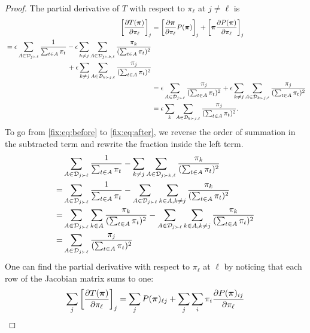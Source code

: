 \begin{proof}
The partial derivative of $T$ with respect to $\pi_\ell$ at $j \ne \ell$ is
\begin{align}
\left[ \frac{\partial T(\bm{\pi})}{\partial \pi_\ell} \right]_j
&= \left[ \frac{\partial \bm{\pi}}{\partial \pi_\ell} P(\bm{\pi}) \right]_j + \left[ \bm{\pi} \frac{\partial P(\bm{\pi})}{\partial \pi_\ell} \right]_j \\
\begin{split}
&= \epsilon \sum_{A \in \mathcal{D}_{j \succ \ell}} \frac{1}{\sum_{t \in A} \pi_t}
    - \epsilon \sum_{k \ne j} \sum_{A \in \mathcal{D}_{j \succ k,\ell}} \frac{\pi_k}{(\sum_{t \in A} \pi_t)^2} \\
    & \qquad\qquad\qquad\qquad\quad + \epsilon \sum_{k \ne j} \sum_{A \in \mathcal{D}_{k \succ j,\ell}} \frac{\pi_j}{(\sum_{t \in A} \pi_t)^2}
\end{split} \label{fix:eq:before}\\
&= \epsilon \sum_{A \in \mathcal{D}_{j \succ \ell}} \frac{\pi_j}{(\sum_{t \in A} \pi_t)^2}
    + \epsilon \sum_{k \ne j} \sum_{A \in \mathcal{D}_{k \succ j,\ell}} \frac{\pi_j}{(\sum_{t \in A} \pi_t)^2} \label{fix:eq:after}\\
&= \epsilon \sum_{k} \sum_{A \in \mathcal{D}_{k \succ j,\ell}} \frac{\pi_j}{(\sum_{t \in A} \pi_t)^2}.
\end{align} 
To go from \eqref{fix:eq:before} to \eqref{fix:eq:after}, we reverse the order of summation in the subtracted term and rewrite the fraction inside the left term.
\begin{align}
 & \sum_{A \in \mathcal{D}_{j \succ \ell}} \frac{1}{\sum_{t \in A} \pi_t}
    - \sum_{k \ne j} \sum_{A \in \mathcal{D}_{j \succ k,\ell}} \frac{\pi_k}{(\sum_{t \in A} \pi_t)^2} \\
=& \sum_{A \in \mathcal{D}_{j \succ \ell}} \frac{1}{\sum_{t \in A} \pi_t}
    - \sum_{A \in \mathcal{D}_{j \succ \ell}} \sum_{k \in A, k \ne j} \frac{\pi_k}{(\sum_{t \in A} \pi_t)^2} \\
=& \sum_{A \in \mathcal{D}_{j \succ \ell}} \sum_{k \in A} \frac{\pi_k}{(\sum_{t \in A} \pi_t)^2}
    - \sum_{A \in \mathcal{D}_{j \succ \ell}} \sum_{k \in A, k \ne j} \frac{\pi_k}{(\sum_{t \in A} \pi_t)^2} \\
=& \sum_{A \in \mathcal{D}_{j \succ \ell}} \frac{\pi_j}{(\sum_{t \in A} \pi_t)^2}
\end{align}
One can find the partial derivative with respect to $\pi_\ell$ at $\ell$ by noticing that each row of the Jacobian matrix sums to one:
\begin{align}
\sum_j \left[ \frac{\partial T(\vpi)}{\partial \pi_\ell} \right]_j
&=\sum_j P(\vpi)_{\ell j} + \sum_j \sum_i \pi_i \frac{\partial P(\vpi)_{ij}}{\partial \pi_\ell} \\

\end{align}
\end{proof}

